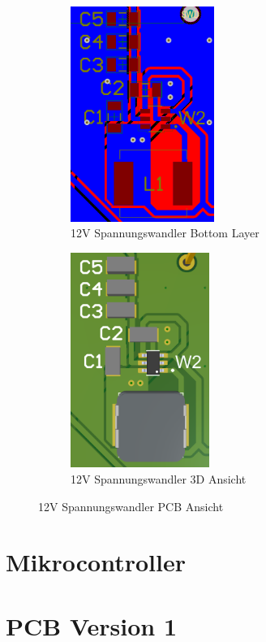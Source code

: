 \begin{inhalt}
\begin{figure}[H]
  \begin{subfigure}[b]{0.48\textwidth}
    \centering
    \includegraphics[height=7cm]{files/Tobias/pics/Schaltungen/PCB/12V_Spannungswandler_PCB_.PNG}
    \caption{12V Spannungswandler Bottom Layer}
    \label{fig:12V_Bottom_layer}
  \end{subfigure}
  \hfill
  \begin{subfigure}[b]{0.48\textwidth}
    \centering
    \includegraphics[height=7cm]{files/Tobias/pics/Schaltungen/PCB/12V_Spannungswandler_PCB_3D.PNG}
    \caption{12V Spannungswandler 3D Ansicht}
    \label{fig:12V_3D_Ansicht}
  \end{subfigure}

  \caption{12V Spannungswandler PCB Ansicht}
  \label{fig:pcb_layers}
\end{figure}
      

   \section{Mikrocontroller}


   

   \section{PCB Version 1}
   \label{ref:PCB_Version_1}

\end{inhalt}
